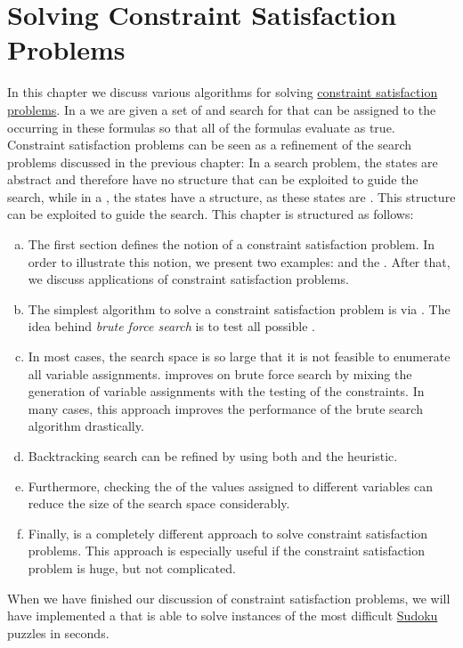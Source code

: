 \chapter{Solving Constraint Satisfaction Problems}
In this chapter we discuss various algorithms for solving 
\href{https://en.wikipedia.org/wiki/Constraint_satisfaction_problem}{constraint satisfaction problems}.
In a  we are given a set of  and search for 
that can be 
assigned to the  occurring in these formulas so that all of the formulas evaluate as true.
Constraint satisfaction problems can be seen as a refinement of the search problems discussed in the previous
chapter:  In a search problem, the states are abstract and therefore have no structure that can be exploited to
guide the search, while in a , the states have a structure, as these
states are .  This structure can be exploited to guide the search.  This chapter is
structured as follows: 
\begin{enumerate}[(a)]
\item The first section defines the notion of a constraint satisfaction problem.  In order to illustrate this
      notion, we present two examples:  and the .  After that, we discuss
      applications of constraint satisfaction problems. 
\item The simplest algorithm to solve a constraint satisfaction problem is via .
      The idea behind \emph{brute force search} is to test all possible .
\item In most cases, the search space is so large that it is not feasible to enumerate all variable assignments.
       improves on brute force search by mixing the generation
      of variable assignments with the testing of the constraints.  In many cases, this approach
      improves the performance of the brute search algorithm drastically.
\item Backtracking search can be refined by using both  and 
      the  heuristic.
\item Furthermore, checking the  of the values assigned to different variables
      can reduce the size of the search space considerably. 
\item Finally,  is a completely different approach to solve
      constraint satisfaction problems.  This approach is especially useful if the constraint satisfaction
      problem is huge, but not complicated.
\end{enumerate}
When we have finished our discussion of constraint satisfaction problems, we will have implemented a
 that is able to solve instances of the most difficult
\href{https://en.wikipedia.org/wiki/Sudoku}{Sudoku} puzzles in seconds.

